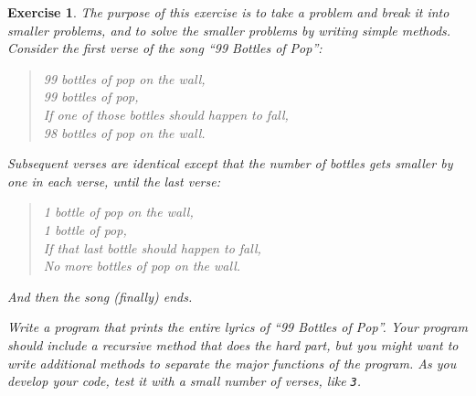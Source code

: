 \documentclass[12pt]{book}
\theoremstyle{exercise}
\newtheorem{exercise}{Exercise}[chapter]
\newcommand{\java}[1]{\verb"#1"}
\newcommand{\java}[1]{\lstinline{#1}} %
\begin{document}
\begin{exercise}


The purpose of this exercise is to take a problem and break it into smaller problems, and to solve the smaller problems by writing simple methods.
Consider the first verse of the song ``99 Bottles of Pop'':

\begin{quote}
99 bottles of pop on the wall,\\
99 bottles of pop,\\
If one of those bottles should happen to fall,\\
98 bottles of pop on the wall.
\end{quote}

Subsequent verses are identical except that the number of bottles gets smaller by one in each verse, until the last verse:

\begin{quote}
1 bottle of pop on the wall,\\
1 bottle of pop,\\
If that last bottle should happen to fall,\\
No more bottles of pop on the wall.
\end{quote}

And then the song (finally) ends.

Write a program that prints the entire lyrics of ``99 Bottles of Pop''.
Your program should include a {\it recursive} method that does the hard part, but you might want to write additional methods to separate the major functions of the program.
As you develop your code, test it with a small number of verses, like \java{3}.

\end{exercise}
\end{document}
